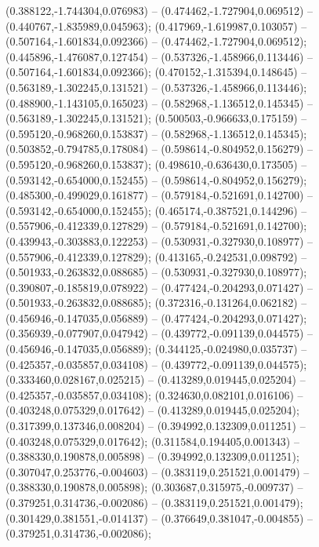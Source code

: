  (0.388122,-1.744304,0.076983) -- (0.474462,-1.727904,0.069512) -- (0.440767,-1.835989,0.045963);
 (0.417969,-1.619987,0.103057) -- (0.507164,-1.601834,0.092366) -- (0.474462,-1.727904,0.069512);
 (0.445896,-1.476087,0.127454) -- (0.537326,-1.458966,0.113446) -- (0.507164,-1.601834,0.092366);
 (0.470152,-1.315394,0.148645) -- (0.563189,-1.302245,0.131521) -- (0.537326,-1.458966,0.113446);
 (0.488900,-1.143105,0.165023) -- (0.582968,-1.136512,0.145345) -- (0.563189,-1.302245,0.131521);
 (0.500503,-0.966633,0.175159) -- (0.595120,-0.968260,0.153837) -- (0.582968,-1.136512,0.145345);
 (0.503852,-0.794785,0.178084) -- (0.598614,-0.804952,0.156279) -- (0.595120,-0.968260,0.153837);
 (0.498610,-0.636430,0.173505) -- (0.593142,-0.654000,0.152455) -- (0.598614,-0.804952,0.156279);
 (0.485300,-0.499029,0.161877) -- (0.579184,-0.521691,0.142700) -- (0.593142,-0.654000,0.152455);
 (0.465174,-0.387521,0.144296) -- (0.557906,-0.412339,0.127829) -- (0.579184,-0.521691,0.142700);
 (0.439943,-0.303883,0.122253) -- (0.530931,-0.327930,0.108977) -- (0.557906,-0.412339,0.127829);
 (0.413165,-0.242531,0.098792) -- (0.501933,-0.263832,0.088685) -- (0.530931,-0.327930,0.108977);
 (0.390807,-0.185819,0.078922) -- (0.477424,-0.204293,0.071427) -- (0.501933,-0.263832,0.088685);
 (0.372316,-0.131264,0.062182) -- (0.456946,-0.147035,0.056889) -- (0.477424,-0.204293,0.071427);
 (0.356939,-0.077907,0.047942) -- (0.439772,-0.091139,0.044575) -- (0.456946,-0.147035,0.056889);
 (0.344125,-0.024980,0.035737) -- (0.425357,-0.035857,0.034108) -- (0.439772,-0.091139,0.044575);
 (0.333460,0.028167,0.025215) -- (0.413289,0.019445,0.025204) -- (0.425357,-0.035857,0.034108);
 (0.324630,0.082101,0.016106) -- (0.403248,0.075329,0.017642) -- (0.413289,0.019445,0.025204);
 (0.317399,0.137346,0.008204) -- (0.394992,0.132309,0.011251) -- (0.403248,0.075329,0.017642);
 (0.311584,0.194405,0.001343) -- (0.388330,0.190878,0.005898) -- (0.394992,0.132309,0.011251);
 (0.307047,0.253776,-0.004603) -- (0.383119,0.251521,0.001479) -- (0.388330,0.190878,0.005898);
 (0.303687,0.315975,-0.009737) -- (0.379251,0.314736,-0.002086) -- (0.383119,0.251521,0.001479);
 (0.301429,0.381551,-0.014137) -- (0.376649,0.381047,-0.004855) -- (0.379251,0.314736,-0.002086);
